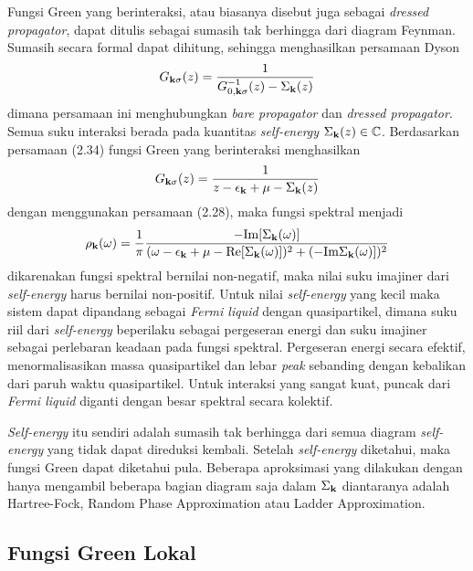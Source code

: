 Fungsi Green yang berinteraksi, atau biasanya disebut juga sebagai \textit{dressed propagator}, dapat ditulis sebagai sumasih tak berhingga dari diagram Feynman\cite{spektral}. Sumasih secara formal dapat dihitung, sehingga menghasilkan persamaan Dyson
\begin{align}
G_{\textbf{k}\sigma}(z) = \frac{1}{G^{-1}_{0,\textbf{k}\sigma}(z) - \Sigma_{\textbf{k}}(z)}
\end{align}
dimana persamaan ini menghubungkan \textit{bare propagator} dan \textit{dressed propagator}. Semua suku interaksi berada pada kuantitas \textit{self-energy} $\Sigma_{\textbf{k}}(z) \in \mathbb{C}$. Berdasarkan persamaan (2.34) fungsi Green yang berinteraksi menghasilkan 
\begin{align}
G_{\textbf{k}\sigma}(z) = \frac{1}{z - \epsilon_{\textbf{k}} + \mu - \Sigma_{\textbf{k}}(z)}
\end{align}
dengan menggunakan persamaan (2.28), maka fungsi spektral menjadi
\begin{align}
\rho_{\textbf{k}}(\omega) = \frac{1}{\pi} \frac{-\text{Im}[\Sigma_{\textbf{k}}(\omega)]}{(\omega - \epsilon_{\textbf{k}} + \mu - \text{Re}[\Sigma_{\textbf{k}}(\omega)])^2 + (-\text{Im}\Sigma_{\textbf{k}}(\omega)])^2}
\end{align}
dikarenakan fungsi spektral bernilai non-negatif, maka nilai suku imajiner dari \textit{self-energy} harus bernilai non-positif. Untuk nilai \textit{self-energy} yang kecil maka sistem dapat dipandang sebagai \textit{Fermi liquid} dengan quasipartikel, dimana suku riil dari \textit{self-energy} beperilaku sebagai pergeseran energi dan suku imajiner sebagai perlebaran keadaan pada fungsi spektral. Pergeseran energi secara efektif, menormalisasikan massa quasipartikel dan lebar \textit{peak} sebanding dengan kebalikan dari paruh waktu quasipartikel. Untuk interaksi yang sangat kuat, puncak dari \textit{Fermi liquid} diganti dengan besar spektral secara kolektif.

\textit{Self-energy} itu sendiri adalah sumasih tak berhingga dari semua diagram \textit{self-energy} yang tidak dapat direduksi kembali. Setelah \textit{self-energy} diketahui, maka fungsi Green dapat diketahui pula. Beberapa aproksimasi yang dilakukan dengan hanya mengambil beberapa bagian diagram saja dalam $\Sigma_{\textbf{k}}$ diantaranya adalah Hartree-Fock, Random Phase Approximation atau Ladder Approximation\cite{ladder}. 

\subsection{Fungsi Green Lokal}

